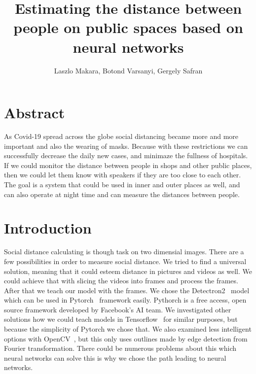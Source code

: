 
\title{Estimating the distance between people on public spaces based on neural networks}

\author{Laszlo Makara, Botond Varsanyi, Gergely Safran}

\maketitle

\tableofcontents
\listoffigures

\chapter*{Abstract}
As Covid-19 spread across the globe social distancing became more and more important and also the wearing of masks. Because with these restrictions we can successfully decrease the daily new cases, and minimaze the fullness of hospitals. If we could monitor the distance between people in shops and other public places, then we could let them know with speakers if they are too close to each other. The goal is a system that could be used in inner and outer places as well, and can also operate at night time and can measure the distances between people.

\chapter{Introduction}
\label{intro}

Social distance calculating is though task on two dimensial images. There are a few possibilities in order to measure social distance. We tried to find a universal solution, meaning that it could esteem
distance in pictures and videos as well. We could achieve that with slicing the videos into frames and process the frames. After that
we teach our model with the frames. We chose the Detectron2~\cite{detectron2} model which can be used in Pytorch~\cite{pytorch} framework easily. Pythorch is a free access, open source framework developed by Facebook's AI team. We investigated other solutions how we could teach models in Tensorflow~\cite{tensorflow} for similar purposes, but because the simplicity of Pytorch we chose that. We also examined less intelligent options with OpenCV~\cite{opencv}, but this only uses outlines made by edge detection from Fourier transformation. There could be numerous problems about this which neural networks
can solve this is why we chose the path leading to neural networks.

